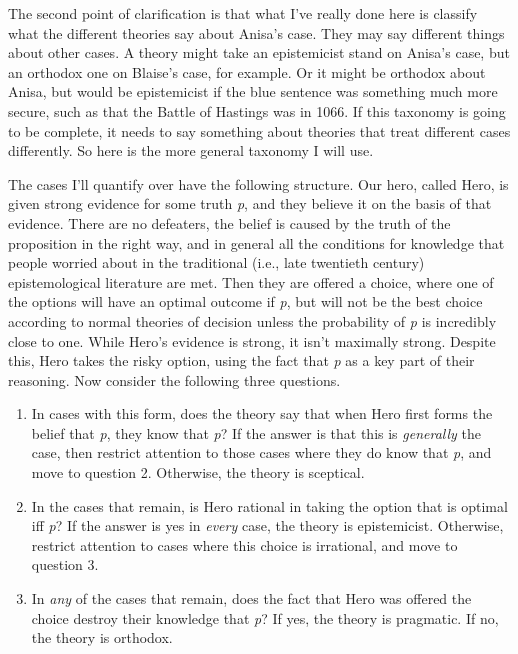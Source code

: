 \documentclass[
  10pt,
  letterpaper,
  twoside]{scrbook}
\providecommand{\tightlist}{%
  \setlength{\itemsep}{0pt}\setlength{\parskip}{0pt}}\usepackage{longtable,booktabs,array}
\begin{document}
The second point of clarification is that what I've really done here is
classify what the different theories say about Anisa's case. They may
say different things about other cases. A theory might take an
epistemicist stand on Anisa's case, but an orthodox one on Blaise's
case, for example. Or it might be orthodox about Anisa, but would be
epistemicist if the blue sentence was something much more secure, such
as that the Battle of Hastings was in 1066. If this taxonomy is going to
be complete, it needs to say something about theories that treat
different cases differently. So here is the more general taxonomy I will
use.

The cases I'll quantify over have the following structure. Our hero,
called Hero, is given strong evidence for some truth \emph{p}, and they
believe it on the basis of that evidence. There are no defeaters, the
belief is caused by the truth of the proposition in the right way, and
in general all the conditions for knowledge that people worried about in
the traditional (i.e., late twentieth century) epistemological
literature are met. Then they are offered a choice, where one of the
options will have an optimal outcome if \emph{p}, but will not be the
best choice according to normal theories of decision unless the
probability of \emph{p} is incredibly close to one. While Hero's
evidence is strong, it isn't maximally strong. Despite this, Hero takes
the risky option, using the fact that \emph{p} as a key part of their
reasoning. Now consider the following three questions.

\begin{enumerate}
\def\labelenumi{\arabic{enumi}.}
\tightlist
\item
  In cases with this form, does the theory say that when Hero first
  forms the belief that \emph{p}, they know that \emph{p}? If the answer
  is that this is \emph{generally} the case, then restrict attention to
  those cases where they do know that \emph{p}, and move to question 2.
  Otherwise, the theory is sceptical.
\item
  In the cases that remain, is Hero rational in taking the option that
  is optimal iff \emph{p}? If the answer is yes in \emph{every} case,
  the theory is epistemicist. Otherwise, restrict attention to cases
  where this choice is irrational, and move to question 3.
\item
  In \emph{any} of the cases that remain, does the fact that Hero was
  offered the choice destroy their knowledge that \emph{p}? If yes, the
  theory is pragmatic. If no, the theory is orthodox.
\end{enumerate}
\end{document}
